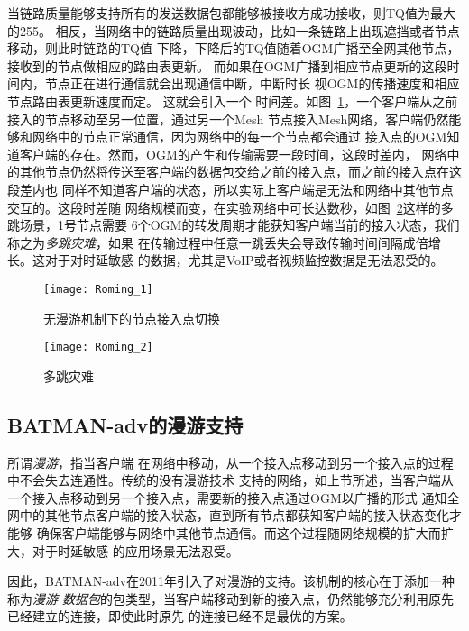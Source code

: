 当链路质量能够支持所有的发送数据包都能够被接收方成功接收，则TQ值为最大的255。
相反，当网络中的链路质量出现波动，比如一条链路上出现遮挡或者节点移动，则此时链路的TQ值
下降，下降后的TQ值随着OGM广播至全网其他节点，接收到的节点做相应的路由表更新。
而如果在OGM广播到相应节点更新的这段时间内，节点正在进行通信就会出现通信中断，中断时长
视OGM的传播速度和相应节点路由表更新速度而定。
这就会引入一个
时间差。如图~\ref{fig:roming_1}，一个客户端从之前接入的节点移动至另一位置，通过另一个Mesh
节点接入Mesh网络，客户端仍然能够和网络中的节点正常通信，因为网络中的每一个节点都会通过
接入点的OGM知道客户端的存在。然而，OGM的产生和传输需要一段时间，这段时差内，
网络中的其他节点仍然将传送至客户端的数据包交给之前的接入点，而之前的接入点在这段差内也
同样不知道客户端的状态，所以实际上客户端是无法和网络中其他节点交互的。这段时差随
网络规模而变，在实验网络中可长达数秒，如图~\ref{fig:roming_2}这样的多跳场景，1号节点需要
6个OGM的转发周期才能获知客户端当前的接入状态，我们称之为\emph{多跳灾难}，如果
在传输过程中任意一跳丢失会导致传输时间间隔成倍增长。这对于对时延敏感
的数据，尤其是VoIP或者视频监控数据是无法忍受的。

\begin{figure}[H] %
  \centering
  \texttt{[image: Roming\_1]}
  \caption{无漫游机制下的节点接入点切换}
  \label{fig:roming_1}
\end{figure}
\begin{figure}[H] %
  \centering
  \texttt{[image: Roming\_2]}
  \caption{多跳灾难}
  \label{fig:roming_2}
\end{figure}

\subsection{BATMAN-adv的漫游支持}
所谓\emph{漫游}，指当客户端
在网络中移动，从一个接入点移动到另一个接入点的过程中不会失去连通性。传统的没有漫游技术
支持的网络，如上节所述，当客户端从一个接入点移动到另一个接入点，需要新的接入点通过OGM以广播的形式
通知全网中的其他节点客户端的接入状态，直到所有节点都获知客户端的接入状态变化才能够
确保客户端能够与网络中其他节点通信。而这个过程随网络规模的扩大而扩大，对于时延敏感
的应用场景无法忍受。

因此，BATMAN-adv在2011年引入了对漫游的支持。该机制的核心在于添加一种称为\emph{漫游
数据包}的包类型，当客户端移动到新的接入点，仍然能够充分利用原先已经建立的连接，即使此时原先
的连接已经不是最优的方案。

